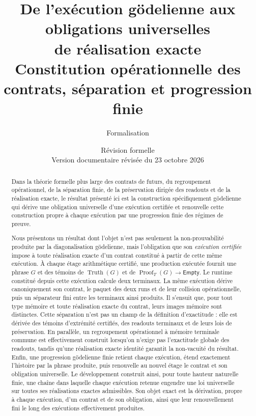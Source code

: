 \documentclass[11pt,a4paper]{article}
\title{De l'exécution gödelienne aux obligations universelles\\
  de réalisation exacte\\[5pt]
  \large Constitution opérationnelle des contrats, séparation et progression finie}
\author{Formalisation \code{relational-perimeter}}
\date{Révision formelle \code{1e5aeda74555}\\
  \small Version documentaire révisée du 23 octobre 2026}
\newcommand{\Truth}{\operatorname{Truth}}
\newcommand{\Proof}{\operatorname{Proof}}
\newcommand{\Empty}{\mathsf{Empty}}
\theoremstyle{remark}
\begin{document}
\maketitle
\vspace{-1.4em}

\begin{abstract}
Dans la théorie formelle plus large des contrats de futurs, du regroupement
opérationnel, de la séparation finie, de la préservation dirigée des readouts
et de la réalisation exacte, le résultat présenté ici est la construction
spécifiquement gödelienne qui dérive une obligation universelle d'une
exécution certifiée et renouvelle cette construction propre à chaque
exécution par une progression finie des régimes de preuve.

Nous présentons un résultat dont l'objet n'est pas seulement la non-prouvabilité
produite par la diagonalisation gödelienne, mais l'obligation que son
\emph{exécution certifiée} impose à toute réalisation exacte d'un contrat
constitué à partir de cette même exécution. À chaque étage arithmétique
certifié, une production exécutée fournit une phrase $G$ et des témoins de
$\Truth(G)$ et de $\Proof_T(G)\to\Empty$. Le runtime constitué depuis cette
exécution calcule deux terminaux. La même exécution dérive canoniquement son
contrat, le paquet des deux runs et de leur collision opérationnelle, puis un
séparateur fini entre les terminaux ainsi produits. Il s'ensuit que, pour tout
type mémoire et toute réalisation exacte du contrat, leurs images mémoire sont
distinctes. Cette séparation n'est pas un champ de la définition d'exactitude :
elle est dérivée des témoins d'extrémité certifiés, des readouts terminaux et
de leurs lois de préservation. En parallèle, un
regroupement opérationnel à mémoire terminale commune est effectivement
construit lorsqu'on n'exige pas l'exactitude globale des readouts, tandis
qu'une réalisation exacte identité garantit la non-vacuité du résultat.
Enfin, une progression gödelienne finie retient chaque exécution, étend
exactement l'histoire par la phrase produite, puis renouvelle au nouvel
étage le contrat et son obligation universelle. Le développement construit
ainsi, pour toute hauteur naturelle finie, une chaîne dans laquelle chaque
exécution retenue engendre une loi universelle sur toutes ses réalisations
exactes admissibles. Son objet exact est la dérivation, propre à chaque
exécution, d'un contrat et de son obligation, ainsi que leur renouvellement
fini le long des exécutions effectivement produites.
\end{abstract}
\end{document}
